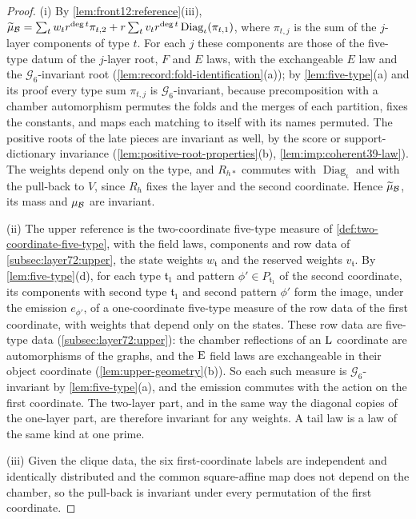 \begin{proof}
(i) By \cref{lem:front12:reference}(iii), $\widetilde\mu_\mathcal B=\sum_tw_tr^{\deg t}
\pi_{t,2}+r\sum_tv_tr^{\deg t}\operatorname{Diag}_\iota(\pi_{t,1})$, where $\pi_{t,j}$
is the sum of the $j$-layer components of type $t$. For each $j$ these
components are those of the five-type datum of the $j$-layer root, $F$ and $E$
laws, with the exchangeable $E$ law and the $\mathcal G_6$-invariant root
(\cref{lem:record:fold-identification}(a)); by \cref{lem:five-type}(a) and its
proof every type sum $\pi_{t,j}$ is $\mathcal G_6$-invariant, because
precomposition with a chamber automorphism permutes the folds and the merges
of each partition, fixes the constants, and maps each matching to itself with
its names permuted. The positive roots of the late pieces are invariant as well,
by the score or support-dictionary invariance
(\cref{lem:positive-root-properties}(b), \cref{lem:imp:coherent39-law}). The
weights depend only on the type, and $R_{h*}$ commutes
with $\operatorname{Diag}_\iota$ and with the pull-back to $V$, since $R_h$ fixes
the layer and the second coordinate. Hence $\widetilde\mu_\mathcal B$, its mass and
$\mu_\mathcal B$ are invariant.

(ii) The upper reference is the two-coordinate five-type measure of
\cref{def:two-coordinate-five-type}, with the field laws, components and row
data of \cref{subsec:layer72:upper}, the state weights $w_{\mathfrak t}$ and the
reserved weights $v_{\mathfrak t}$. By \cref{lem:five-type}(d), for each type
$\mathfrak t_1$ and pattern $\phi'\in P_{\mathfrak t_1}$ of the second coordinate,
its components with second type $\mathfrak t_1$ and second pattern $\phi'$ form the
image, under the emission $e_{\phi'}$, of a
one-coordinate five-type measure of the row data of the first coordinate, with
weights that depend only on the states. These row data are five-type data
(\cref{subsec:layer72:upper}): the chamber reflections of an $\rm L$ coordinate
are automorphisms of the graphs, and the $\rm E$ field laws are exchangeable in
their object coordinate (\cref{lem:upper-geometry}(b)). So each such measure is
$\mathcal G_6$-invariant by \cref{lem:five-type}(a), and the emission commutes with
the action on the first coordinate. The two-layer part, and in the same way
the diagonal copies of the one-layer part, are therefore invariant for any
weights. A tail law is a law of the same kind at one prime.

(iii) Given the clique data, the six first-coordinate labels are independent and
identically distributed and the common square-affine map does not depend on
the chamber, so the pull-back is invariant under every permutation of the
first coordinate.


\end{proof}

